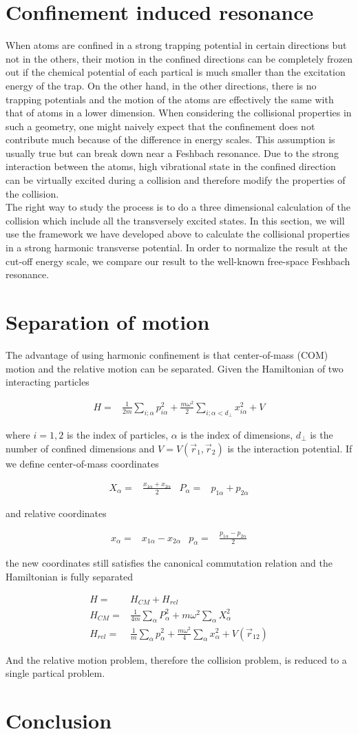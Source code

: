 \documentclass[aps,twocolumn,secnumarabic,balancelastpage,amsmath,amssymb,nofootinbib]{revtex4}
\newcommand{\eqar}[1]
{
  \begin{align*}
    #1
  \end{align*}
}
\newcommand{\paren}[1]{{\left({#1}\right)}}
\begin{document}
\section{Confinement induced resonance}
When atoms are confined in a strong trapping potential in certain directions but not in the others, their motion in the confined directions can be completely frozen out if the chemical potential of each partical is much smaller than the excitation energy of the trap. On the other hand, in the other directions, there is no trapping potentials and the motion of the atoms are effectively the same with that of atoms in a lower dimension. When considering the collisional properties in such a geometry, one might naively expect that the confinement does not contribute much because of the difference in energy scales. This assumption is usually true but can break down near a Feshbach resonance. Due to the strong interaction between the atoms, high vibrational state in the confined direction can be virtually excited during a collision and therefore modify the properties of the collision.\\

The right way to study the process is to do a three dimensional calculation of the collision which include all the transversely excited states. In this section, we will use the framework we have developed above to calculate the collisional properties in a strong harmonic transverse potential. In order to normalize the result at the cut-off energy scale, we compare our result to the well-known free-space Feshbach resonance.

\section{Separation of motion}
The advantage of using harmonic confinement is that center-of-mass (COM) motion and the relative motion can be separated. Given the Hamiltonian of two interacting particles
\eqar{
  H=&\frac{1}{2m}\sum_{i;\alpha}p_{i\alpha}^2+\frac{m\omega^2}{2}\sum_{i;\alpha<d_\perp}x_{i\alpha}^2+V
}
where $i=1,2$ is the index of particles, $\alpha$ is the index of dimensions, $d_\perp$ is the number of confined dimensions and $V=V\paren{\vec r_1, \vec r_2}$ is the interaction potential. If we define center-of-mass coordinates
\eqar{
  X_\alpha=&\frac{x_{1\alpha}+x_{2\alpha}}{2}&P_\alpha=&p_{1\alpha}+p_{2\alpha}
}
and relative coordinates
\eqar{
  x_\alpha=&x_{1\alpha}-x_{2\alpha}&p_\alpha=&\frac{p_{1\alpha}-p_{2\alpha}}{2}
}
the new coordinates still satisfies the canonical commutation relation and the Hamiltonian is fully separated
\eqar{
  H=&H_{CM}+H_{rel}\\
  H_{CM}=&\frac{1}{4m}\sum_\alpha P_\alpha^2+m\omega^2\sum_\alpha X_\alpha^2\\
  H_{rel}=&\frac{1}{m}\sum_\alpha p_\alpha^2+\frac{m\omega^2}{4}\sum_\alpha x_\alpha^2+V\paren{\vec r_{12}}
}
And the relative motion problem, therefore the collision problem, is reduced to a single partical problem.






\section{Conclusion}


\end{document}
